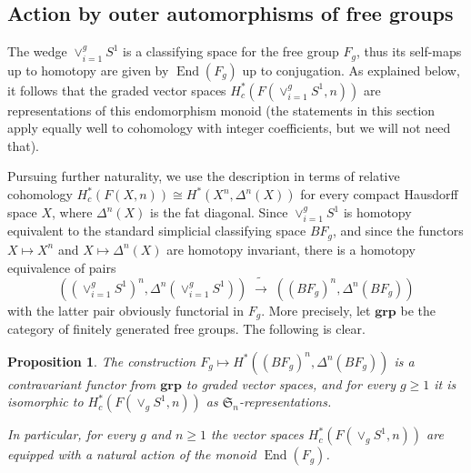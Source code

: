 \documentclass[12pt]{article}
\newcommand{\SymGroup}[1][n]{\mathfrak{S}_{#1}}
\DeclareMathOperator{\End}{End}
\theoremstyle{plain}
\newtheorem{prop}[thm]{Proposition}
\theoremstyle{definition}
\theoremstyle{remark}
\begin{document}
\subsection{Action by outer automorphisms of free groups}\label{sec:out-action}
The wedge $\vee_{i=1}^g S^1$ is a classifying space for the free group $F_g$, thus its self-maps up to homotopy are given by $\End(F_g)$ up to conjugation. As explained below, it follows that the graded vector spaces $H^*_c( F(\vee_{i=1}^g S^1,n))$ are representations of this endomorphism monoid (the statements in this section apply equally well to cohomology with integer coefficients, but we will not need that). 

Pursuing further naturality, we use the description in terms of relative cohomology $H^*_c(F(X,n)) \cong H^*(X^n,\Delta^n(X))$ for every compact Hausdorff space $X$, where $\Delta^n(X)$ is the fat diagonal.  Since $\vee_{i=1}^g S^1$ is homotopy equivalent to the standard simplicial classifying space $BF_g$, and since the functors $X\mapsto X^n$ and $X\mapsto \Delta^n(X)$ 
are homotopy invariant, there is a homotopy equivalence of pairs %
\begin{equation}
    ((\vee_{i=1}^g S^1)^n,\Delta^n(\vee_{i=1}^g S^1)) \;\tilde\longrightarrow\; ((BF_g)^n,\Delta^n(BF_g))
\end{equation}
with the latter pair obviously functorial in $F_g$.
More precisely, let $\mathbf{grp}$ be the category of finitely generated free groups. The following is clear.
\begin{prop}
The construction $F_g \mapsto H^*( (BF_g)^n,\Delta^n(BF_g))$
is a contravariant functor from $\mathbf{grp}$ to graded vector spaces, and for every $g\geq 1$ it is isomorphic to $H^*_c( F(\vee_g S^1,n))$ as $\SymGroup$-representations.

In particular, for every $g$ and $n\geq 1$ the vector spaces $H^*_c( F(\vee_g S^1,n))$ are equipped with a natural action of the monoid $\End(F_g)$.
\end{prop}
\end{document}
